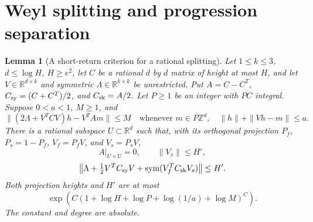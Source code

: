 \documentclass[11pt]{article}
\newtheorem{lemma}[theorem]{Lemma}
\theoremstyle{definition}
\newcommand{\R}{\mathbb R}
\newcommand{\Z}{\mathbb Z}
\newcommand{\sym}{\operatorname{sym}}
\numberwithin{equation}{section}
\begin{document}
\section{Weyl splitting and progression separation}\label{sec:charts}
\begin{lemma}[A short-return criterion for a rational splitting]\label{lem:return-splitting}
Let $1\le k\le3$, $d\le\log H$, $H\ge e^2$, let $C$ be a rational $d$ by $d$ matrix of height at most $H$, and let $V\in\R^{d\times k}$ and symmetric $\Lambda\in\R^{k\times k}$ be unrestricted. Put $A=C-C^T$, $C_{\rm sy}=(C+C^T)/2$, and $C_{\rm sk}=A/2$. Let $P\ge1$ be an integer with $PC$ integral. Suppose $0<a<1$, $M\ge1$, and
\[
 \|(2\Lambda+V^TCV)h-V^TAm\|\le M
 \quad\text{whenever }m\in P\Z^d,\quad \|h\|+\|Vh-m\|\le a.
\]
There is a rational subspace $U\subset\R^d$ such that, with its orthogonal projection $P_f$, $P_s=1-P_f$, $V_f=P_fV$, and $V_s=P_sV$,
\[
 A|_{U\times U}=0,\qquad \|V_s\|\le H',
\]
\[
 \left\|\Lambda+\tfrac12V^TC_{\rm sy}V+\sym(V_f^TC_{\rm sk}V_s)\right\|\le H'.
\]
Both projection heights and $H'$ are at most
\[
 \exp\!\left(C(1+\log H+\log P+\log(1/a)+\log M)^C\right).
\]
The constant and degree are absolute.
\end{lemma}
\end{document}
